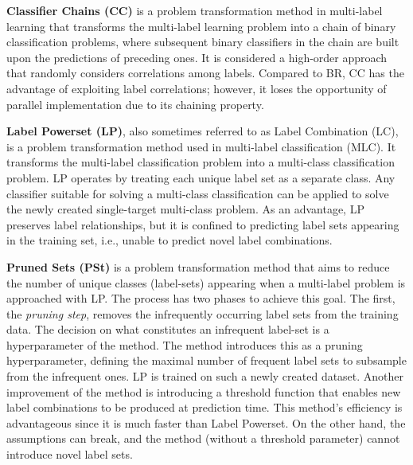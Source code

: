 \textbf{Classifier Chains (CC)} is a problem transformation method in multi-label learning that transforms the multi-label learning problem into a chain of binary classification problems, where subsequent binary classifiers in the chain are built upon the predictions of preceding ones. It is considered a high-order approach that randomly considers correlations among labels. Compared to BR, CC has the advantage of exploiting label correlations; however, it loses the opportunity of parallel implementation due to its chaining property. \cite{zhang2014}

\textbf{Label Powerset (LP)}, also sometimes referred to as Label Combination (LC), is a problem transformation method used in multi-label classification (MLC). It transforms the multi-label classification problem into a multi-class classification problem. LP operates by treating each unique label set as a separate class. Any classifier suitable for solving a multi-class classification can be applied to solve the newly created single-target multi-class problem. As an advantage, LP preserves label relationships, but it is confined to predicting label sets appearing in the training set, i.e., unable to predict novel label combinations. \cite{zhang2014}

\textbf{Pruned Sets (PSt)} is a problem transformation method that aims to reduce the number of unique classes (label-sets) appearing when a multi-label problem is approached with LP. The process has two phases to achieve this goal. The first, the \textit{pruning step}, removes the infrequently occurring label sets from the training data. The decision on what constitutes an infrequent label-set is a hyperparameter of the method. The method introduces this as a pruning hyperparameter, defining the maximal number of frequent label sets to subsample from the infrequent ones. LP is trained on such a newly created dataset. Another improvement of the method is introducing a threshold function that enables new label combinations to be produced at prediction time. This method's efficiency is advantageous since it is much faster than Label Powerset. On the other hand, the assumptions can break, and the method (without a threshold parameter) cannot introduce novel label sets.



